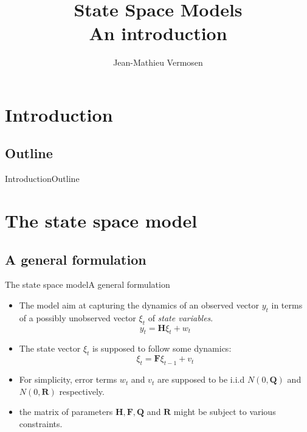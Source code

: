 \documentclass[10pt]{beamer}
\title[The State Space Model]{State Space Models\\ An introduction}
\author[J.M. Vermosen]{Jean-Mathieu Vermosen}
\institute[Rutgers Univ.]{Rutgers University}
\begin{document}
%
%
\frame{\maketitle}
%
%
\section*{Introduction}
%
%
\subsection*{Outline}
%
%
\begin{frame}{Introduction}{Outline}
%
\tableofcontents
%
\end{frame}
%
\section{The state space model}
%
\subsection{A general formulation}
%
%
\begin{frame}{The state space model}{A general formulation}
%
%
%
\begin{itemize}
\item The model aim at capturing the dynamics of an observed vector $y_{t}$ in terms of a possibly unobserved vector $\xi_{t}$ of \emph{state variables}.
%
\begin{equation}\label{eq:1}
y_{t} = \mathbf{H}\xi_{t} + w_{t}
\end{equation}
%
\item The state vector $\xi_{t}$ is supposed to follow some dynamics:
%
\begin{equation}\label{eq:2}
\xi_{t} = \mathbf{F}\xi_{t-1} + v_{t}
\end{equation}
%
\item For simplicity, error terms $w_{t}$ and $v_{t}$ are supposed to be i.i.d $N(0,\mathbf{Q})$ and $N(0,\mathbf{R})$ respectively.
%
\item the matrix of parameters $\mathbf H, \mathbf F, \mathbf Q$ and $\mathbf R$ might be subject to various constraints.
\end{itemize}
%
\end{frame}
%
\end{document}
